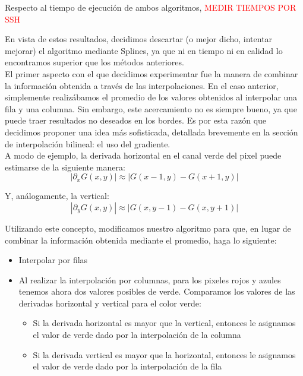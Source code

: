 \documentclass[a4paper]{article}
\begin{document}
Respecto al tiempo de ejecución de ambos algoritmos, \textcolor{red}{MEDIR TIEMPOS POR SSH\\}

En vista de estos resultados, decidimos descartar (o mejor dicho, intentar mejorar) el algoritmo mediante Splines, ya que ni en tiempo ni en calidad lo encontramos superior que los métodos anteriores.\\

El primer aspecto con el que decidimos experimentar fue la manera de combinar la información obtenida a través de las interpolaciones. En el caso anterior, simplemente realizábamos el promedio de los valores obtenidos al interpolar una fila y una columna. Sin embargo, este acercamiento no es siempre bueno, ya que puede traer resultados no deseados en los bordes. Es por esta razón que decidimos proponer una idea más sofisticada, detallada brevemente en la sección de interpolación bilineal: el uso del gradiente. \\

A modo de ejemplo, la derivada horizontal en el canal verde del pixel puede estimarse de la siguiente manera:
\[|\partial_xG(x,y)| \approx |G(x-1,y) - G(x+1,y)|\]


Y, análogamente, la vertical:
\[|\partial_yG(x,y)| \approx |G(x,y-1) - G(x,y+1)|\]


Utilizando este concepto, modificamos nuestro algoritmo para que, en lugar de combinar la información obtenida mediante el promedio, haga lo siguiente:

\begin{itemize}
\item Interpolar por filas
\item Al realizar la interpolación por columnas, para los pixeles rojos y azules tenemos ahora dos valores posibles de verde. Comparamos los valores de las derivadas horizontal y vertical para el color verde:
\begin{itemize}
\item Si la derivada horizontal es mayor que la vertical, entonces le asignamos el valor de verde dado por la interpolación de la columna
\item Si la derivada vertical es mayor que la horizontal, entonces le asignamos el valor de verde dado por la interpolación de la fila
\end{itemize}
\end{itemize}
\end{document}
